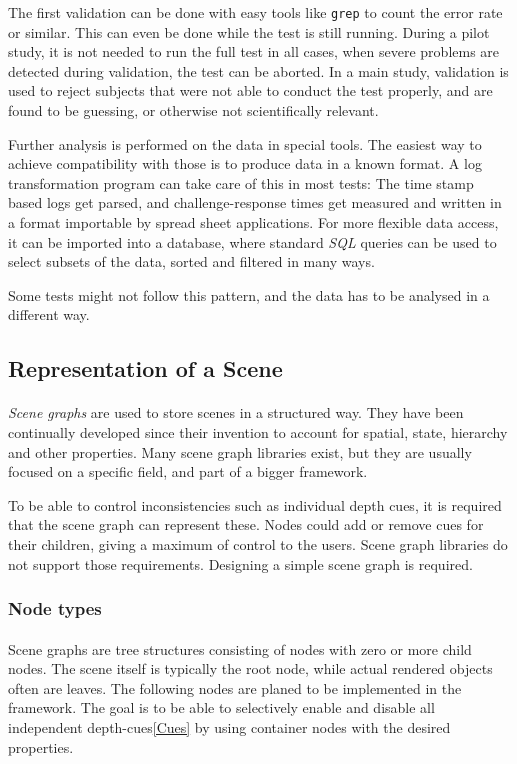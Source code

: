 The first validation can be done with easy tools like \texttt{grep} to count the error rate or similar.
This can even be done while the test is still running.
During a pilot study, it is not needed to run the full test in all cases, when severe problems are detected during validation, the test can be aborted.
In a main study, validation is used to reject subjects that were not able to conduct the test properly, and are found to be guessing, or otherwise not scientifically relevant.

Further analysis is performed on the data in special tools.
The easiest way to achieve compatibility with those is to produce data in a known format.
A log transformation program can take care of this in most tests: The time stamp based logs get parsed, and challenge-response times get measured and written in a format importable by spread sheet applications.
For more flexible data access, it can be imported into a database, where standard \textit{SQL} queries can be used to select subsets of the data, sorted and filtered in many ways.

Some tests might not follow this pattern, and the data has to be analysed in a different way.


\subsection{Representation of a Scene\label{sceneRep}}
\paragraph{}
\textit{Scene graphs} are used to store scenes in a structured way. They have been continually developed since their invention\cite{scenegraph} to account for spatial, state, hierarchy and other properties.
Many scene graph libraries exist, but they are usually focused on a specific field, and part of a bigger framework.

To be able to control inconsistencies such as individual depth cues, it is required that the scene graph can represent these. Nodes could add or remove cues for their children, giving a maximum of control to the users. Scene graph libraries do not support those requirements. Designing a simple scene graph is required.

\subsubsection{Node types}
\paragraph{}
Scene graphs are tree structures consisting of nodes with zero or more child nodes. The scene itself is typically the root node, while actual rendered objects often are leaves. The following nodes are planed to be implemented in the framework.
The goal is to be able to selectively enable and disable all independent depth-cues\ref{Cues} by using container nodes with the desired properties.


